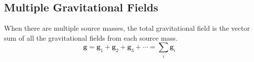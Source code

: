 %
%        
%
%
%
%
\subsection{Multiple Gravitational Fields}
When there are multiple source masses, the total gravitational field is the
vector sum of all the gravitational fields from each source mass.
\begin{equation}
  \bm g =\bm g_1+\bm g_2+\bm g_3+\cdots=\sum_i \bm g_i
\end{equation}



